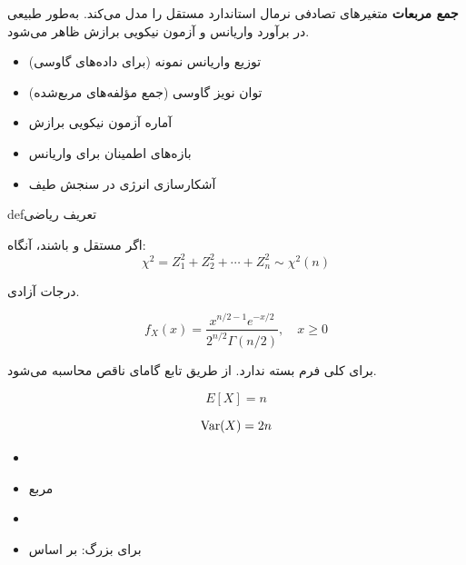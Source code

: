 

\textbf{جمع مربعات} متغیرهای تصادفی نرمال استاندارد مستقل را مدل می‌کند. به‌طور طبیعی در برآورد واریانس و آزمون نیکویی برازش ظاهر می‌شود.


\begin{itemize}
\tightlist
\item
  توزیع واریانس نمونه (برای داده‌های گاوسی)
\item
  توان نویز گاوسی (جمع مؤلفه‌های مربع‌شده)
\item
  آماره آزمون نیکویی برازش
\item
  بازه‌های اطمینان برای واریانس
\item
  آشکارسازی انرژی در سنجش طیف
\end{itemize}

\begin{PSbox}[unbreakable]{def}{تعریف ریاضی}

اگر  مستقل و  باشند، آنگاه:\PSbr{}\[\chi^2 = Z_1^2 + Z_2^2 + \cdots + Z_n^2 \sim \chi^2(n)\]

 درجات آزادی.

\end{PSbox}


\[f_X(x) = \frac{x^{n/2-1} e^{-x/2}}{2^{n/2}\Gamma(n/2)}, \quad x \geq 0\]


برای  کلی فرم بسته ندارد. از طریق تابع گامای ناقص محاسبه می‌شود.


\[E[X] = n\]


\[\text{Var}(X) = 2n\]


\begin{itemize}
\tightlist
\item
\item
   مربع 
\item
\item
  برای  بزرگ:  بر اساس 
\end{itemize}

